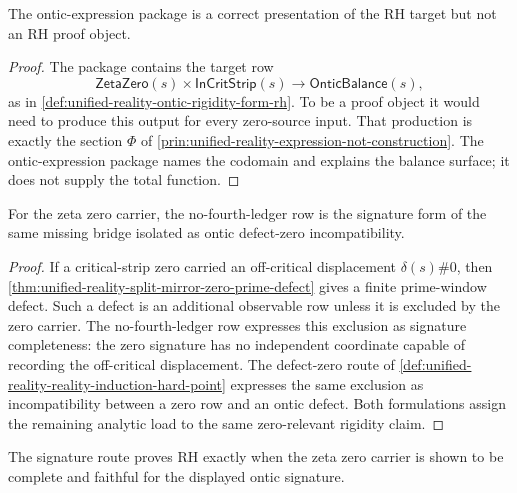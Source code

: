\begin{theorem}
\label{thm:unified-reality-ontic-expression-weaker-than-rh-construction}
The ontic-expression package is a correct presentation of the RH target
but not an RH proof object.
\end{theorem}

\begin{proof}
The package contains the target row
$$
\mathsf{ZetaZero}(s)\times\mathsf{InCritStrip}(s)
\to
\mathsf{OnticBalance}(s),
$$
as in
\autoref{def:unified-reality-ontic-rigidity-form-rh}.  To be a proof
object it would need to produce this output for every zero-source input.
That production is exactly the section $\Phi$ of
\autoref{prin:unified-reality-expression-not-construction}.  The
ontic-expression package names the codomain and explains the balance
surface; it does not supply the total function.
\end{proof}

\begin{theorem}
\label{thm:unified-reality-no-fourth-ledger-defect-zero-incompatibility}
For the zeta zero carrier, the no-fourth-ledger row is the signature
form of the same missing bridge isolated as ontic defect-zero
incompatibility.
\end{theorem}

\begin{proof}
If a critical-strip zero carried an off-critical displacement
$\delta(s)\#0$, then
\autoref{thm:unified-reality-split-mirror-zero-prime-defect} gives a
finite prime-window defect.  Such a defect is an additional observable
row unless it is excluded by the zero carrier.  The no-fourth-ledger row
expresses this exclusion as signature completeness: the zero signature
has no independent coordinate capable of recording the off-critical
displacement.  The defect-zero route of
\autoref{def:unified-reality-reality-induction-hard-point} expresses the
same exclusion as incompatibility between a zero row and an ontic
defect.  Both formulations assign the remaining analytic load to the
same zero-relevant rigidity claim.
\end{proof}

\begin{corollary}
\label{cor:unified-reality-exact-boundary-signature-route}
The signature route proves RH exactly when the zeta zero carrier is
shown to be complete and faithful for the displayed ontic signature.
\end{corollary}

